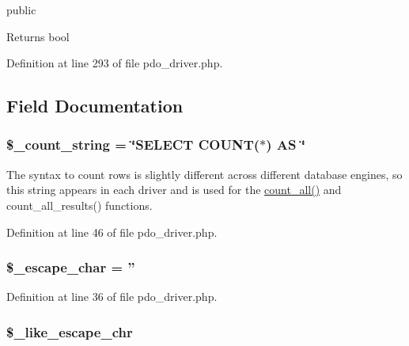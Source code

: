 public \begin{DoxyReturn}{Returns}
bool 
\end{DoxyReturn}


Definition at line 293 of file pdo\-\_\-driver.\-php.



\subsection{Field Documentation}
\hypertarget{class_c_i___d_b__pdo__driver_a06c80bac2ecbd0557827e96949c23097}{
\subsubsection[{\$\-\_\-count\-\_\-string}]{\setlength{\rightskip}{0pt plus 5cm}\$\-\_\-count\-\_\-string = \char`\"{}S\-E\-L\-E\-C\-T C\-O\-U\-N\-T($\ast$) A\-S \char`\"{}}}\label{class_c_i___d_b__pdo__driver_a06c80bac2ecbd0557827e96949c23097}
The syntax to count rows is slightly different across different database engines, so this string appears in each driver and is used for the \hyperlink{class_c_i___d_b__pdo__driver_a66111c61856499b091af32502978d4fc}{count\-\_\-all()} and count\-\_\-all\-\_\-results() functions. 

Definition at line 46 of file pdo\-\_\-driver.\-php.

\hypertarget{class_c_i___d_b__pdo__driver_aaec2fb0112850159063a8e47ad3aed6e}{
\subsubsection[{\$\-\_\-escape\-\_\-char}]{\setlength{\rightskip}{0pt plus 5cm}\$\-\_\-escape\-\_\-char = ''}}\label{class_c_i___d_b__pdo__driver_aaec2fb0112850159063a8e47ad3aed6e}


Definition at line 36 of file pdo\-\_\-driver.\-php.

\hypertarget{class_c_i___d_b__pdo__driver_a668acfd923d0342389cd3a614628cf2a}{
\subsubsection[{\$\-\_\-like\-\_\-escape\-\_\-chr}]{\setlength{\rightskip}{0pt plus 5cm}\$\-\_\-like\-\_\-escape\-\_\-chr}}\label{class_c_i___d_b__pdo__driver_a668acfd923d0342389cd3a614628cf2a}


